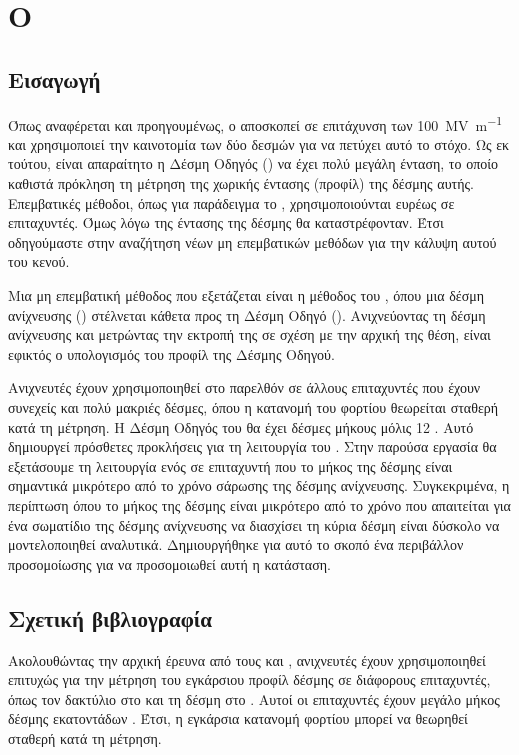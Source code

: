 \section{Ο }

\subsection{Εισαγωγή}

Όπως αναφέρεται και προηγουμένως, ο  αποσκοπεί σε επιτάχυνση των \SI[per-mode = symbol]{100}{\mega \volt \per \metre} και χρησιμοποιεί την καινοτομία των δύο δεσμών για να πετύχει αυτό το στόχο. 
Ως εκ τούτου, είναι απαραίτητο η Δέσμη Οδηγός () να έχει πολύ μεγάλη ένταση, το οποίο καθιστά πρόκληση τη μέτρηση της χωρικής έντασης (προφίλ) της δέσμης αυτής. 
Επεμβατικές μέθοδοι, όπως για παράδειγμα το , χρησιμοποιούνται ευρέως σε επιταχυντές. Όμως λόγω της έντασης της δέσμης θα καταστρέφονταν. 
Έτσι οδηγούμαστε στην αναζήτηση νέων μη επεμβατικών μεθόδων για την κάλυψη αυτού του κενού.

Μια μη επεμβατική μέθοδος που εξετάζεται είναι η μέθοδος του , όπου μια δέσμη ανίχνευσης () στέλνεται κάθετα προς τη Δέσμη Οδηγό (). 
Ανιχνεύοντας τη δέσμη ανίχνευσης και μετρώντας την εκτροπή της σε σχέση με την αρχική της θέση, είναι εφικτός ο υπολογισμός του προφίλ της Δέσμης Οδηγού.

Ανιχνευτές  έχουν χρησιμοποιηθεί στο παρελθόν σε άλλους επιταχυντές που έχουν συνεχείς και πολύ μακριές δέσμες, όπου η κατανομή του φορτίου θεωρείται σταθερή κατά τη μέτρηση.
Η Δέσμη Οδηγός του  θα έχει δέσμες μήκους μόλις \num{12} . 
Αυτό δημιουργεί πρόσθετες προκλήσεις για τη λειτουργία του .
Στην παρούσα εργασία θα εξετάσουμε τη λειτουργία ενός  σε επιταχυντή που το μήκος της δέσμης είναι σημαντικά μικρότερο από το χρόνο σάρωσης της δέσμης ανίχνευσης. 
Συγκεκριμένα, η περίπτωση όπου το μήκος της δέσμης είναι μικρότερο από το χρόνο που απαιτείται για ένα σωματίδιο της δέσμης ανίχνευσης να διασχίσει τη κύρια δέσμη είναι δύσκολο να μοντελοποιηθεί αναλυτικά. 
Δημιουργήθηκε για αυτό το σκοπό ένα περιβάλλον προσομοίωσης για να προσομοιωθεί αυτή η κατάσταση.

\subsection{Σχετική βιβλιογραφία} %
Ακολουθώντας την αρχική έρευνα από τους  και  \cite{Pasour1992}, ανιχνευτές  έχουν χρησιμοποιηθεί επιτυχώς για την μέτρηση του εγκάρσιου προφίλ δέσμης σε διάφορους επιταχυντές, όπως τον δακτύλιο  στο  \cite{Aleksandrov2005} \cite{Blokland2009} και τη δέσμη  στο  \cite{Roy2005}. 
Αυτοί οι επιταχυντές έχουν μεγάλο μήκος δέσμης εκατοντάδων . 
Έτσι, η εγκάρσια κατανομή φορτίου μπορεί να θεωρηθεί σταθερή κατά τη μέτρηση.


